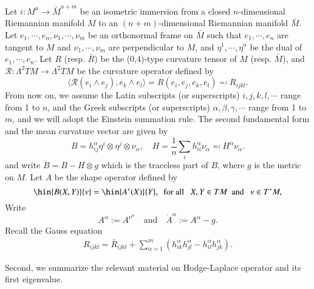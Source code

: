 \documentclass[12pt]{amsart}
\theoremstyle{plain}
\theoremstyle{remark}
\theoremstyle{definition}
\numberwithin{equation}{section}
\begin{document}
Let $i:M^n\to \bar{M}^{n+m}$ be an isometric immersion from a closed $n$-dimensional
Riemannian manifold $M$ to an $(n+m)$-dimensional Riemannian manifold $\bar{M}$. Let $e_1, \cdots, e_n, \nu_1, \cdots,\nu_m$ be an orthonormal frame on $\bar{M}$ such that $e_1, \cdots, e_n$ are tangent to $M$ and $\nu_1, \cdots,\nu_m$ are perpendicular to $M$, and $\eta^1, \cdots, \eta^n$ be the dual of $e_1, \cdots, e_n$. Let $R$ (resp. $\bar{R}$) be the (0,4)-type curvature tensor of $M$ (resp. $\bar{M}$), and $\mathcal{R}:\Lambda^2TM\to \Lambda^2TM$ be the curvature operator defined by
$$
\langle \mathcal{R}(e_i\wedge e_j),e_k\wedge e_l\rangle = R(e_i,e_j,e_k,e_l)\eqqcolon R_{ijkl}.
$$
From now on, we assume the Latin subscripts (or superscripts) $i,j,k,l,\cdots$  range from 1 to $n$, and the Greek subscripts (or superscripts) $\alpha,\beta, \gamma, \cdots$ range from 1 to $m$, and we will adopt the Einstein summation rule.
The second fundamental form and the mean curvature vector are given by
$$
B=h^\alpha_{ij} \eta^i\otimes\eta^j\otimes\nu_\alpha,\quad H=\frac{1}{n}\sum_i h_{ii}^\alpha\nu_\alpha\eqqcolon H^\alpha\nu_\alpha.
$$
and write $\mathring{B} = B - H\otimes g$ which is the traceless part of $B$, where $g$ is the metric on $M$.
Let $A$ be the shape operator defined by
$$
\hin{B(X,Y)}{\nu}= \hin{A^{\nu}(X)}{Y}, \ \  \text{for all }\ \  X,Y\in TM \ \ \text{and }\ \ \nu\in T^*M,
$$
Write $$
A^\alpha:= A^{\nu^\alpha}\quad \text{and} \quad \mathring{A}^\alpha := A^\alpha - g.$$
Recall the  Gauss equation
\begin{align}\label{eq:gauss}
R_{ijkl}=\bar R_{ijkl}+\sum_{\alpha=1}^m\left(h_{ik}^{\alpha}h_{jl}^{\alpha}-h_{il}^{\alpha}h_{jk}^{\alpha}\right).
\end{align}

Second, we summarize the relevant material on Hodge-Laplace operator and its first eigenvalue.
\end{document}
